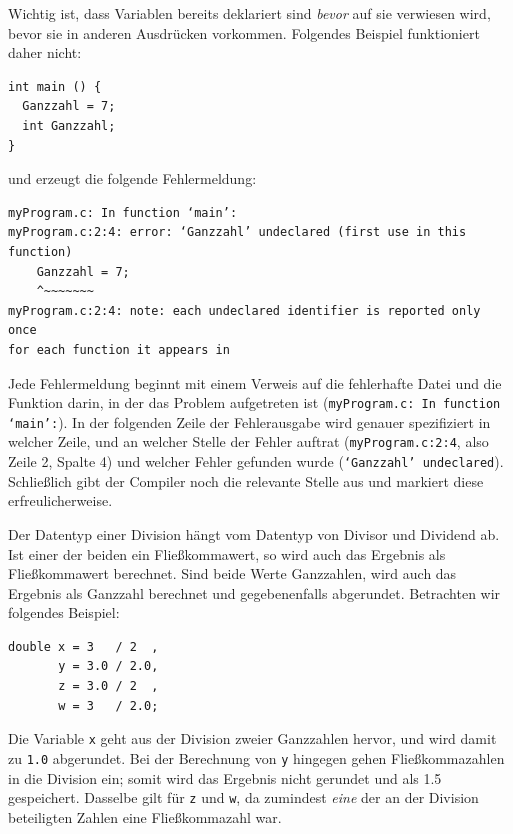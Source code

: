 Wichtig ist, dass Variablen bereits deklariert sind \emph{bevor} auf sie verwiesen wird, \ie bevor sie in anderen Ausdrücken vorkommen. Folgendes Beispiel funktioniert daher nicht:
\begin{codebox}
\begin{verbatim}
int main () {
  Ganzzahl = 7;
  int Ganzzahl;
}
\end{verbatim}
\end{codebox}
und erzeugt die folgende Fehlermeldung:
\begin{cmdbox}
\begin{verbatim}
myProgram.c: In function ‘main’:
myProgram.c:2:4: error: ‘Ganzzahl’ undeclared (first use in this
function)
    Ganzzahl = 7;
    ^~~~~~~~
myProgram.c:2:4: note: each undeclared identifier is reported only once
for each function it appears in
\end{verbatim}
\end{cmdbox}
Jede Fehlermeldung beginnt mit einem Verweis auf die fehlerhafte Datei und die Funktion darin, in der das Problem aufgetreten ist (\texttt{myProgram.c: In function ‘main’:}). In der folgenden Zeile der Fehlerausgabe wird genauer spezifiziert in welcher Zeile, und an welcher Stelle der Fehler auftrat (\texttt{myProgram.c:2:4}, also  Zeile 2, Spalte 4) und welcher Fehler gefunden wurde (\texttt{‘Ganzzahl’ undeclared}). Schließlich gibt der Compiler noch die relevante Stelle aus und markiert diese erfreulicherweise.

\begin{hintbox}
Der Datentyp einer Division hängt vom Datentyp von Divisor und Dividend ab. Ist einer der beiden ein Fließkommawert, so wird auch das Ergebnis als Fließkommawert berechnet. Sind beide Werte Ganzzahlen, wird auch das Ergebnis als Ganzzahl berechnet und gegebenenfalls abgerundet. Betrachten wir folgendes Beispiel:
\begin{codebox}
\begin{verbatim}
double x = 3   / 2  ,
       y = 3.0 / 2.0,
       z = 3.0 / 2  ,
       w = 3   / 2.0;
\end{verbatim}
\end{codebox}
Die Variable \texttt{x} geht aus der Division zweier Ganzzahlen hervor, und wird damit zu \texttt{1.0} abgerundet. Bei der Berechnung von \texttt{y} hingegen gehen Fließkommazahlen in die Division ein; somit wird das Ergebnis nicht gerundet und als 1.5 gespeichert. Dasselbe gilt für \texttt{z} und \texttt{w}, da zumindest \emph{eine} der an der Division beteiligten Zahlen eine Fließkommazahl war.
\end{hintbox}

